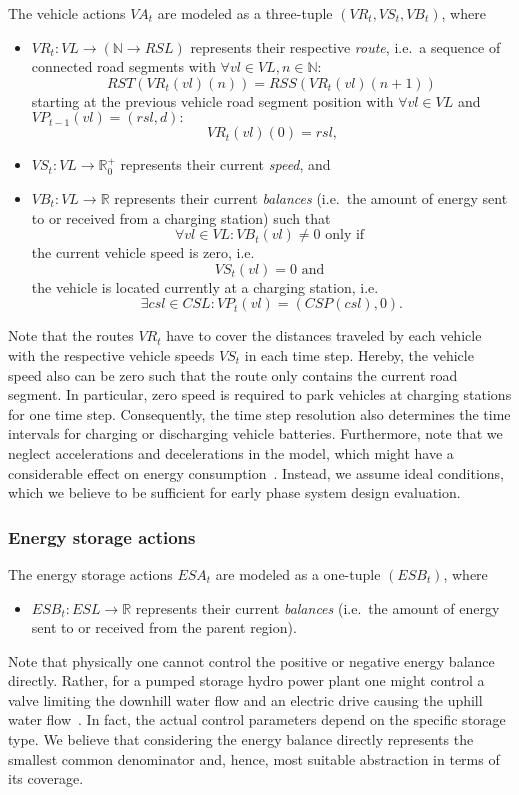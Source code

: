 The vehicle actions $VA_t$ are modeled as a three-tuple $(VR_t, VS_t, VB_t)$, where
\begin{itemize}
	\item $VR_t: VL \rightarrow (\mathbb{N} \rightarrow RSL)$ represents their respective \textit{route}, i.e.\ a sequence of connected road segments with $\forall vl \in VL, n \in \mathbb{N}:$
	\[
		RST(VR_t(vl)(n)) = RSS(VR_t(vl)(n + 1))
	\]
	starting at the previous vehicle road segment position with $\forall vl \in VL$ and $VP_{t-1}(vl) = (rsl, d):$
	\[
		VR_t(vl)(0) = rsl \textrm{,}
	\]
	\item $VS_t: VL \rightarrow \mathbb{R}_0^+$ represents their current \textit{speed}, and
	\item $VB_t: VL \rightarrow \mathbb{R}$ represents their current \textit{balances} (i.e.\ the amount of energy sent to or received from a charging station) such that
	\[
		\forall vl \in VL: VB_t(vl) \neq 0 \textrm{ only if }
	\]
	the current vehicle speed is zero, i.e.\
	\[
		 VS_t(vl) = 0 \textrm{ and }
	\]
	the vehicle is located currently at a charging station, i.e.\
	\[
		\exists csl \in CSL: VP_t(vl) = (CSP(csl), 0) \textrm{.}
	\]
\end{itemize}
Note that the routes $VR_t$ have to cover the distances traveled by each vehicle with the respective vehicle speeds $VS_t$ in each time step. Hereby, the vehicle speed also can be zero such that the route only contains the current road segment. In particular, zero speed is required to park vehicles at charging stations for one time step. Consequently, the time step resolution also determines the time intervals for charging or discharging vehicle batteries. Furthermore, note that we neglect accelerations and decelerations in the model, which might have a considerable effect on energy consumption~\cite{gao2007modeling}. Instead, we assume ideal conditions, which we believe to be sufficient for early phase system design evaluation.

\subsubsection{Energy storage actions}
\label{actions_storages}

The energy storage actions $ESA_t$ are modeled as a one-tuple $(ESB_t)$, where
\begin{itemize}
	\item $ESB_t: ESL \rightarrow \mathbb{R}$ represents their current \textit{balances} (i.e.\ the amount of energy sent to or received from the parent region).
\end{itemize}
Note that physically one cannot control the positive or negative energy balance directly. Rather, for a pumped storage hydro power plant one might control a valve limiting the downhill water flow and an electric drive causing the uphill water flow~\cite{Castronuovo2004}. In fact, the actual control parameters depend on the specific storage type. We believe that considering the energy balance directly represents the smallest common denominator and, hence, most suitable abstraction in terms of its coverage.

